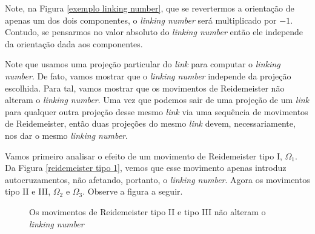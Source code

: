 	\par\vspace{0.3cm} Note, na Figura \eqref{exemplo linking number}, que se revertermos a orientação de apenas um dos dois componentes, o \textit{linking number} será multiplicado por $-1$. Contudo, se pensarmos no valor absoluto do \textit{linking number} então ele independe da orientação dada aos componentes.
	\par\vspace{0.3cm} Note que usamos uma projeção particular do \textit{link} para computar o \textit{linking number}. De fato, vamos mostrar que o \textit{linking number} independe da projeção escolhida. Para tal, vamos mostrar que os movimentos de Reidemeister não alteram o \textit{linking number}. Uma vez que podemos sair de uma projeção de um \textit{link} para qualquer outra projeção desse mesmo \textit{link} via uma sequência de movimentos de Reidemeister, então duas projeções do mesmo \textit{link} devem, necessariamente, nos dar o mesmo \textit{linking number}.
	\par\vspace{0.3cm} Vamos primeiro analisar o efeito de um movimento de Reidemeister tipo I, $\Omega_1$. Da Figura \eqref{reidemeister tipo 1}, vemos que esse movimento apenas introduz autocruzamentos, não afetando, portanto, o \textit{linking number}. Agora os movimentos tipo II e III, $\Omega_2$ e $\Omega_3$. Observe a figura a seguir.
	\begin{figure}[H]
        \centering
        \hfill
        \caption{Os movimentos de Reidemeister tipo II e tipo III não alteram o \textit{linking number}}
    \end{figure}
